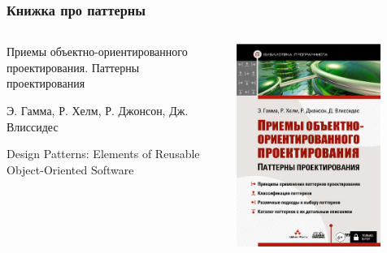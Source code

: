 \documentclass[xetex,mathserif,serif]{beamer}
\begin{document}
    \begin{frame}
        \frametitle{Книжка про паттерны}
        \begin{columns}
            \begin{column}{0.6\textwidth}
                Приемы объектно-ориентированного проектирования. Паттерны проектирования

                Э. Гамма, Р. Хелм, Р. Джонсон, Дж. Влиссидес

                Design Patterns: Elements of Reusable Object-Oriented Software
            \end{column}
            \begin{column}{0.4\textwidth}
                \begin{center}
                    \includegraphics[width=0.8\textwidth]{patternBookCover.png}
                \end{center}
            \end{column}
        \end{columns}
    \end{frame}
\end{document}
